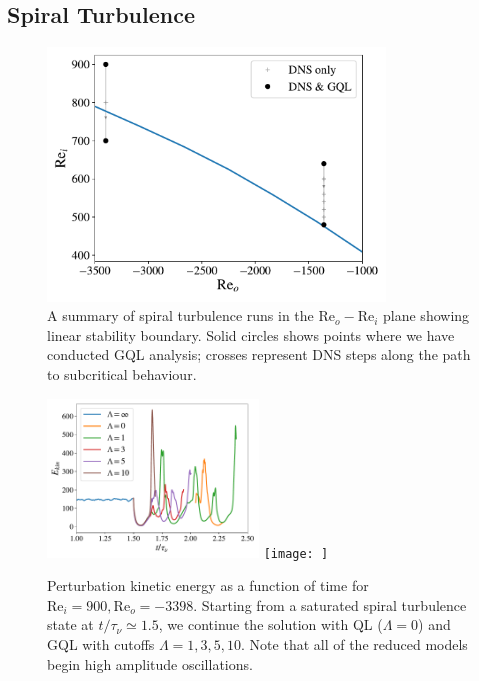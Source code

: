 \documentclass[openacc]{rstransa}%
\newcommand{\Reyn}{\mathrm{Re}}
\begin{document}
\subsection{Spiral Turbulence}
\begin{figure}
    \centering
    \includegraphics[width=0.8\textwidth]{../figs/reo_rei_lsb.pdf}
    \caption{A summary of spiral turbulence runs in the $\Reyn_o-\Reyn_i$ plane showing linear stability boundary. Solid circles shows points where we have conducted GQL analysis; crosses represent DNS steps along the path to subcritical behaviour. }
    \label{fig:LSB}
\end{figure}

\begin{figure}
    \centering
    \includegraphics[width=0.5\textwidth]{figs/rei900_reo_-3398_KE_vs_t.pdf}
    \texttt{[image: ]}
    \caption{Perturbation kinetic energy as a function of time for $\Reyn_i = 900, \Reyn_o=-3398$. Starting from a saturated spiral turbulence state at $t/\tau_\nu \simeq 1.5$, we continue the solution with QL ($\Lambda = 0$) and GQL with cutoffs $\Lambda = 1,3,5,10$. Note that all of the reduced models begin high amplitude oscillations.}
    \label{fig:ke_vs_t_rei900}
\end{figure}
\end{document}
